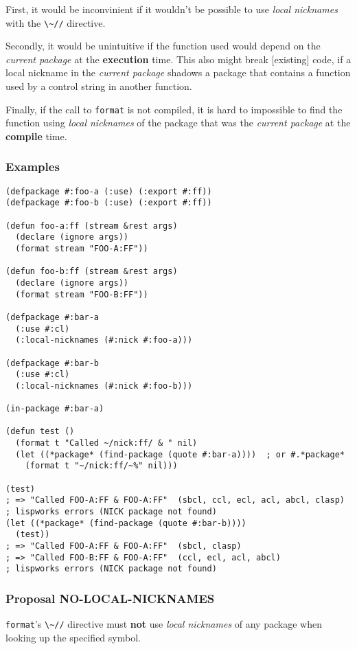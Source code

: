 \documentclass[11pt]{article}
\begin{document}
First, it would be inconvinient if it wouldn't be possible to use \emph{local
nicknames} with the \texttt{\textbackslash{}\textasciitilde{}//} directive.

Secondly, it would be unintuitive if the function used would depend on the
\emph{current package} at the \textbf{execution} time. This also might break [existing] code,
if a local nickname in the \emph{current package} shadows a package that contains a
function used by a control string in another function.

Finally, if the call to \texttt{format} is not compiled, it is hard to impossible to find
the function using \emph{local nicknames} of the package that was the \emph{current package}
at the \textbf{compile} time.
\subsubsection{Examples}
\label{sec:org3f6d601}
\begin{verbatim}
(defpackage #:foo-a (:use) (:export #:ff))
(defpackage #:foo-b (:use) (:export #:ff))

(defun foo-a:ff (stream &rest args)
  (declare (ignore args))
  (format stream "FOO-A:FF"))

(defun foo-b:ff (stream &rest args)
  (declare (ignore args))
  (format stream "FOO-B:FF"))

(defpackage #:bar-a
  (:use #:cl)
  (:local-nicknames (#:nick #:foo-a)))

(defpackage #:bar-b
  (:use #:cl)
  (:local-nicknames (#:nick #:foo-b)))

(in-package #:bar-a)

(defun test ()
  (format t "Called ~/nick:ff/ & " nil)
  (let ((*package* (find-package (quote #:bar-a))))  ; or #.*package*
    (format t "~/nick:ff/~%" nil)))

(test)
; => "Called FOO-A:FF & FOO-A:FF"  (sbcl, ccl, ecl, acl, abcl, clasp)
; lispworks errors (NICK package not found)
(let ((*package* (find-package (quote #:bar-b))))
  (test))
; => "Called FOO-A:FF & FOO-A:FF"  (sbcl, clasp)
; => "Called FOO-B:FF & FOO-A:FF"  (ccl, ecl, acl, abcl)
; lispworks errors (NICK package not found)
\end{verbatim}
\subsubsection{Proposal NO-LOCAL-NICKNAMES}
\label{sec:org9eed4d9}
\texttt{format}'s \texttt{\textbackslash{}\textasciitilde{}//} directive must \textbf{not} use \emph{local nicknames} of any package when
looking up the specified symbol.
\end{document}
